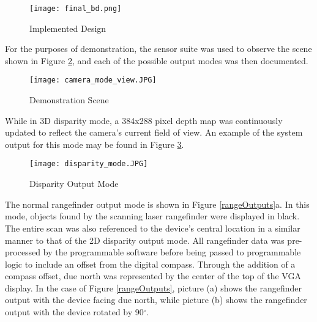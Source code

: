 \begin{figure}[H] 
	\centerline{
	\texttt{[image: final\_bd.png]}
	}
	\caption{Implemented Design}
	\label{finalBD}
\end{figure}
\par
For the purposes of demonstration, the sensor suite was used to observe the scene shown in Figure \ref{demoScene}, and each of the possible output modes was then documented.
\par
\begin{figure}[H]  
 	\centerline{
	\texttt{[image: camera\_mode\_view.JPG]}
	}
	\caption{Demonstration Scene}
	\label{demoScene}
\end{figure}  
\par
While in 3D disparity mode, a 384x288 pixel depth map was continuously updated to reflect the camera's current field of view. An example of the system output for this mode may be found in Figure \ref{disparityOutputs}. 
\begin{figure}[H] 
              \centerline{\texttt{[image: disparity\_mode.JPG]}}
\caption{Disparity Output Mode}
\label{disparityOutputs}
\end{figure}

The normal rangefinder output mode is shown in Figure \ref{rangeOutputs}a. In this mode, objects found by the scanning laser rangefinder were displayed in black. The entire scan was also referenced to the device's central location in a similar manner to that of the 2D disparity output mode. All rangefinder data was pre-processed by the programmable software before being passed to programmable logic to include an offset from the digital compass.  Through the addition of a compass offset, due north was represented by the center of the top of the VGA display. In the case of Figure \ref{rangeOutputs}, picture (a) shows the rangefinder output with the device facing due north, while picture (b) shows the rangefinder output with the device rotated by 90$^\circ$.
\par 


